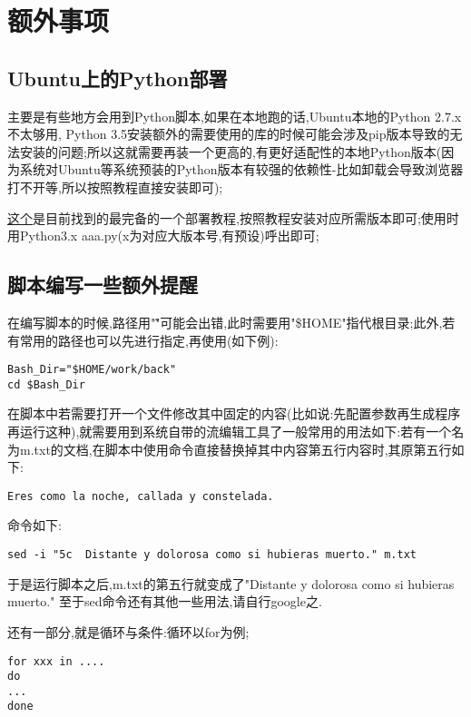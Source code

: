\section{额外事项}
\subsection{Ubuntu上的Python部署}
主要是有些地方会用到Python脚本,如果在本地跑的话,Ubuntu本地的Python 2.7.x不太够用, Python 3.5安装额外的需要使用的库的时候可能会涉及pip版本导致的无法安装的问题;所以这就需要再装一个更高的,有更好适配性的本地Python版本(因为系统对Ubuntu等系统预装的Python版本有较强的依赖性-比如卸载会导致浏览器打不开等,所以按照教程直接安装即可);\par

\href{https://blog.csdn.net/qq_35743870/article/details/125903040}{这个}是目前找到的最完备的一个部署教程,按照教程安装对应所需版本即可;使用时用Python3.x aaa.py(x为对应大版本号,有预设)呼出即可;


\subsection{脚本编写一些额外提醒}
在编写脚本的时候,路径用"\~"可能会出错,此时需要用"\$HOME"指代根目录;此外,若有常用的路径也可以先进行指定,再使用(如下例):\par
\begin{lstlisting}[frame=single]
Bash_Dir="$HOME/work/back"
cd $Bash_Dir
\end{lstlisting}
\par

在脚本中若需要打开一个文件修改其中固定的内容(比如说:先配置参数再生成程序再运行这种),就需要用到系统自带的流编辑工具了一般常用的用法如下:若有一个名为m.txt的文档,在脚本中使用命令直接替换掉其中内容第五行内容时,其原第五行如下:\par
\begin{lstlisting}[frame=single]
Eres como la noche, callada y constelada.
\end{lstlisting}
\par
命令如下:
\begin{lstlisting}[frame=single]
sed -i "5c  Distante y dolorosa como si hubieras muerto." m.txt
\end{lstlisting}
\par
于是运行脚本之后,m.txt的第五行就变成了"Distante y dolorosa como si hubieras muerto." 至于sed命令还有其他一些用法,请自行google之.\par

还有一部分,就是循环与条件:循环以for为例;\par
\begin{lstlisting}[frame=single]
for xxx in ....
do
...
done
\end{lstlisting}
\par

